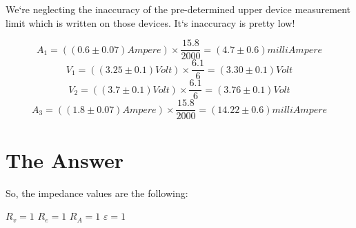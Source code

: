 \documentclass[12pt]{article}
\begin{document}
    We`re neglecting the inaccuracy of the pre-determined upper device measurement limit which is written on those devices.
    It`s inaccuracy is pretty low!

    \begin{equation*}
        A_1 = \left( \left(0.6 \pm 0.07 \right) Ampere \right) \times \frac{15.8}{2000} = \left(4.7 \pm 0.6 \right) milliAmpere
    \end{equation*}
    \begin{equation*}
        V_1 = \left( \left(3.25 \pm 0.1 \right) Volt \right) \times \frac{6.1}{6} = \left(3.30 \pm 0.1 \right) Volt
    \end{equation*}
    \begin{equation*}
        V_2 = \left( \left(3.7 \pm 0.1 \right) Volt \right) \times \frac{6.1}{6} = \left(3.76 \pm 0.1 \right) Volt
    \end{equation*}
    \begin{equation*}
        A_3 = \left( \left(1.8 \pm 0.07 \right) Ampere \right) \times \frac{15.8}{2000} = \left(14.22 \pm 0.6 \right) milliAmpere
    \end{equation*}


    \section{The Answer}\label{sec:answer}
So, the impedance values are the following:

$R_v = 1$
$R_e = 1$
$R_A = 1$
$\varepsilon = 1$
\end{document}
